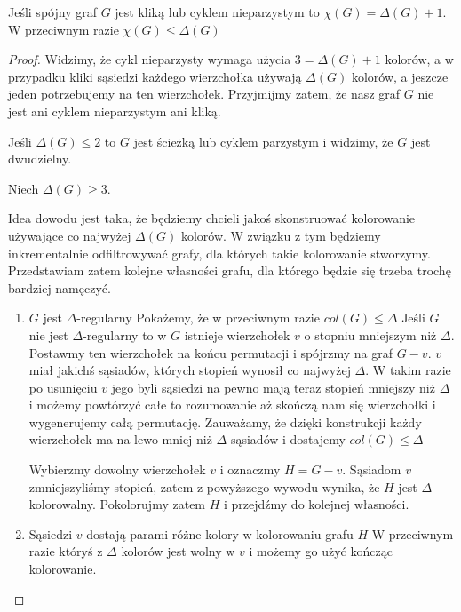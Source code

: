 \begin{theorem}[Brooks]
	Jeśli spójny graf \(G\) jest kliką lub cyklem nieparzystym to \(\chi(G) = \Delta(G) + 1\).
	W przeciwnym razie \(\chi(G) \leq \Delta(G)\)
\end{theorem}

\begin{proof}
	Widzimy, że cykl nieparzysty wymaga użycia \(3 = \Delta(G) + 1\) kolorów,
	a w przypadku kliki sąsiedzi każdego wierzchołka używają \(\Delta(G)\) kolorów, a jeszcze jeden potrzebujemy na ten wierzchołek. Przyjmijmy zatem, że nasz graf \(G\) nie jest
	ani cyklem nieparzystym ani kliką.

	Jeśli \(\Delta(G) \leq 2\) to \(G\) jest ścieżką lub cyklem parzystym i widzimy, że \(G\) jest dwudzielny.

	Niech \(\Delta(G) \geq 3\).

	Idea dowodu jest taka, że będziemy chcieli jakoś skonstruować kolorowanie używające co najwyżej \(\Delta(G)\) kolorów. W związku z tym będziemy inkrementalnie odfiltrowywać grafy, dla których takie kolorowanie stworzymy.
	Przedstawiam zatem kolejne własności grafu, dla którego będzie się trzeba trochę bardziej namęczyć.

	\begin{enumerate}
		\item \(G\) jest \(\Delta\)-regularny
		      Pokażemy, że w przeciwnym razie \(col(G) \leq \Delta\)
		      Jeśli \(G\) nie jest \(\Delta\)-regularny to w \(G\) istnieje wierzchołek \(v\) o stopniu mniejszym niż \(\Delta\).
		      Postawmy ten wierzchołek na końcu permutacji i spójrzmy na graf \(G - v\).
		      \(v\) miał jakichś sąsiadów, których stopień wynosił co najwyżej \(\Delta\).
		      W takim razie po usunięciu \(v\) jego byli sąsiedzi na pewno mają teraz stopień mniejszy niż \(\Delta\)
		      i możemy powtórzyć całe to rozumowanie aż skończą nam się wierzchołki i wygenerujemy całą permutację.
		      Zauważamy, że dzięki konstrukcji każdy wierzchołek ma na lewo mniej niż \(\Delta\) sąsiadów i dostajemy \(col(G) \leq \Delta\)

		      Wybierzmy dowolny wierzchołek \(v\) i oznaczmy \(H = G - v\).
		      Sąsiadom \(v\) zmniejszyliśmy stopień, zatem z powyższego wywodu wynika, że \(H\) jest \(\Delta\)-kolorowalny.
		      Pokolorujmy zatem \(H\) i przejdźmy do kolejnej własności.

		\item Sąsiedzi \(v\) dostają parami różne kolory w kolorowaniu grafu \(H\)
		      W przeciwnym razie któryś z \(\Delta\) kolorów jest wolny w \(v\) i możemy go użyć kończąc kolorowanie.


\end{enumerate}
\end{proof}
